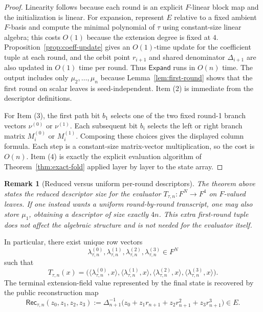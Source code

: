 \documentclass[11pt]{article}
\newtheorem{remark}[theorem]{Remark}
\begin{document}
\begin{proof}
Linearity follows because each round is an explicit \(F\)-linear block map and the initialization is linear. For expansion, represent \(E\) relative to a fixed ambient \(F\)-basis and compute the minimal polynomial of \(\tau\) using constant-size linear algebra; this costs \(O(1)\) because the extension degree is fixed at \(4\). Proposition~\ref{prop:coeff-update} gives an \(O(1)\)-time update for the coefficient tuple at each round, and the orbit point \(r_{i+1}\) and shared denominator \(\Delta_{i+1}\) are also updated in \(O(1)\) time per round. Thus \(\mathsf{Expand}\) runs in \(O(n)\) time. The output includes only \(\mu_2,\dots,\mu_n\) because Lemma~\ref{lem:first-round} shows that the first round on scalar leaves is seed-independent. Item (2) is immediate from the descriptor definitions.

For Item (3), the first path bit \(b_1\) selects one of the two fixed round-1 branch vectors \(\nu^{(0)}\) or \(\nu^{(1)}\). Each subsequent bit \(b_i\) selects the left or right branch matrix \(M_i^{(0)}\) or \(M_i^{(1)}\). Composing these choices gives the displayed column formula. Each step is a constant-size matrix-vector multiplication, so the cost is \(O(n)\). Item (4) is exactly the explicit evaluation algorithm of Theorem~\ref{thm:exact-fold} applied layer by layer to the state array.
\end{proof}

\begin{remark}[Reduced versus uniform per-round descriptors]
\label{rem:tight-vs-uniform}
The theorem above states the reduced descriptor size for the evaluator \(T_{\tau,n}:F^N\to F^4\) on \(F\)-valued leaves. If one instead wants a uniform round-by-round transcript, one may also store \(\mu_1\), obtaining a descriptor of size exactly \(4n\). This extra first-round tuple does not affect the algebraic structure and is not needed for the evaluator itself.
\end{remark}

In particular, there exist unique row vectors
\[
\lambda_{\tau,n}^{(0)},\lambda_{\tau,n}^{(1)},\lambda_{\tau,n}^{(2)},\lambda_{\tau,n}^{(3)}\in F^N
\]
such that
\[
T_{\tau,n}(x)=
\big(
\langle\lambda_{\tau,n}^{(0)},x\rangle,
\langle\lambda_{\tau,n}^{(1)},x\rangle,
\langle\lambda_{\tau,n}^{(2)},x\rangle,
\langle\lambda_{\tau,n}^{(3)},x\rangle
\big).
\]
The terminal extension-field value represented by the final state is recovered by the public reconstruction map
\[
\mathsf{Rec}_{\tau,n}(z_0,z_1,z_2,z_3)
:=
\Delta_{n+1}^{-1}\big(z_0+z_1r_{n+1}+z_2r_{n+1}^2+z_3r_{n+1}^3\big)\in E.
\]
\end{document}
